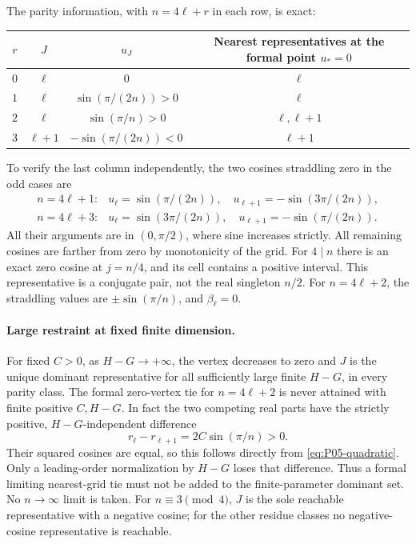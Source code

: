 \documentclass[11pt]{article}
\theoremstyle{definition}
\theoremstyle{remark}
\begin{document}
The parity information, with $n=4\ell+r$ in each row, is exact:
\begin{center}
\renewcommand{\arraystretch}{1.2}
\begin{tabular}{@{}c c c c@{}}
\toprule
$r$ & $J$ & $u_J$ & Nearest representatives at the formal point $u_*=0$\\
\midrule
$0$ & $\ell$ & $0$ & $\ell$\\
$1$ & $\ell$ & $\sin(\pi/(2n))>0$ & $\ell$\\
$2$ & $\ell$ & $\sin(\pi/n)>0$ & $\ell,\ell+1$\\
$3$ & $\ell+1$ & $-\sin(\pi/(2n))<0$ & $\ell+1$\\
\bottomrule
\end{tabular}
\end{center}
To verify the last column independently, the two cosines straddling zero
in the odd cases are
\[
 \begin{array}{ll}
 n=4\ell+1:&u_\ell=\sin(\pi/(2n)),\quad
             u_{\ell+1}=-\sin(3\pi/(2n)),\\
 n=4\ell+3:&u_\ell=\sin(3\pi/(2n)),\quad
             u_{\ell+1}=-\sin(\pi/(2n)).
 \end{array}
\]
All their arguments are in $(0,\pi/2)$, where sine increases strictly.
All remaining cosines are farther from zero by monotonicity of the grid.
For $4\mid n$ there is an exact zero cosine at $j=n/4$, and its cell
contains a positive interval. This representative is a conjugate pair,
not the real singleton $n/2$. For $n=4\ell+2$, the straddling values
are $\pm\sin(\pi/n)$, and $\beta_\ell=0$.

\paragraph{Large restraint at fixed finite dimension.}
For fixed $C>0$, as $H-G\to+\infty$, the vertex decreases to zero
and $J$ is the unique dominant representative for all sufficiently large
finite $H-G$, in every parity class. The formal zero-vertex tie for
$n=4\ell+2$ is never attained with finite positive $C,H-G$.
In fact the two competing real parts have the strictly positive,
$H-G$-independent difference
\[
 r_\ell-r_{\ell+1}=2C\sin(\pi/n)>0.
\]
Their squared cosines are equal, so this follows directly from
\eqref{eq:P05-quadratic}. Only a leading-order normalization by $H-G$
loses that difference. Thus a formal limiting nearest-grid tie must not
be added to the finite-parameter dominant set. No $n\to\infty$ limit is taken.
For $n\equiv3\pmod4$, $J$ is the sole reachable representative with a
negative cosine; for the other residue classes no negative-cosine
representative is reachable.
\end{document}
